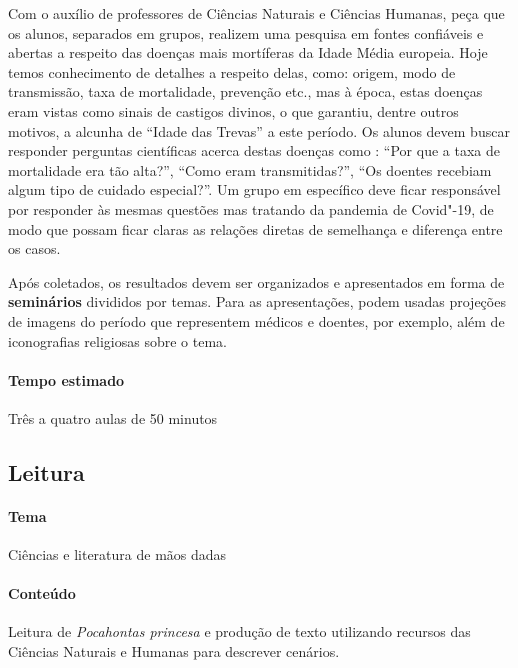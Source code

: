 \documentclass[12pt]{extarticle}
\begin{document}
 		Com o auxílio de professores de Ciências Naturais e Ciências Humanas,
 		peça que os alunos, separados em grupos, realizem uma pesquisa em fontes confiáveis
 		e abertas a respeito das doenças mais mortíferas da Idade Média europeia. 
 		Hoje temos conhecimento de detalhes a respeito delas, como: origem, modo
 		de transmissão, taxa de mortalidade, prevenção etc., mas à época, estas
 		doenças eram vistas como sinais de castigos divinos, o que garantiu, dentre outros
 		motivos, a alcunha de ``Idade das Trevas'' a este período. Os alunos devem 
 		buscar responder perguntas científicas acerca destas doenças como : ``Por que
 		a taxa de mortalidade era tão alta?'', ``Como eram transmitidas?'', ``Os doentes
 		recebiam algum tipo de cuidado especial?''. Um grupo em específico deve
 		ficar responsável por responder às mesmas questões mas tratando da pandemia
 		de Covid"-19, de modo que possam ficar claras as relações diretas de semelhança
 		e diferença entre os casos.
 	
 		Após coletados, os resultados devem ser organizados e apresentados em forma 
 		de \textbf{seminários} divididos por temas. Para as apresentações, podem usadas
 		projeções de imagens do período que representem médicos e doentes, por exemplo,
 		além de iconografias religiosas sobre o tema.
 	
 \paragraph{Tempo estimado} Três a quatro aulas de 50 minutos


\subsection{Leitura}

 \paragraph{Tema} Ciências e literatura de mãos dadas

 \paragraph{Conteúdo} Leitura de \emph{Pocahontas princesa} e produção de texto
 utilizando recursos das Ciências Naturais e Humanas para descrever cenários.
\end{document}
